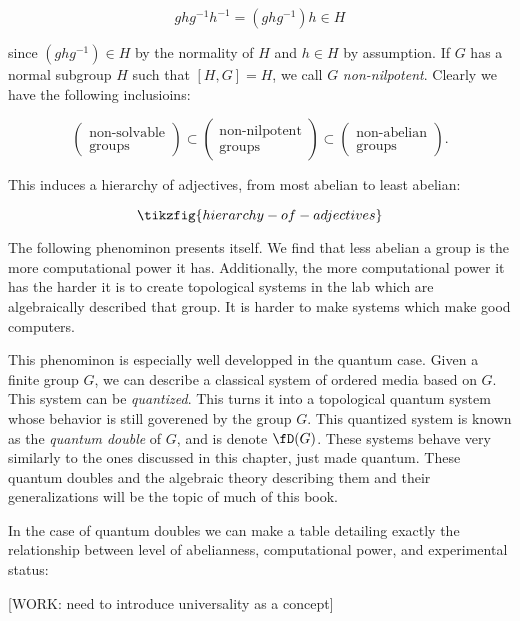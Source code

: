 $$g h g^{-1} h^{-1}= (g h g^{-1}) h \in H$$

since $(g h g^{-1}) \in H$ by the normality of $H$ and $h\in H$ by assumption. If $G$ has a normal subgroup $H$ such that $[H,G]=H$, we call $G$ \textit{non-nilpotent}. Clearly we have the following inclusioins:

$$
\left(\substack{\text{non-solvable} \\ \text{groups}}\right)\subset
\left(\substack{\text{non-nilpotent} \\ \text{groups}}\right)\subset
\left(\substack{\text{non-abelian} \\ \text{groups}}\right).
$$

This induces a hierarchy of adjectives, from most abelian to least abelian:

\begin{equation*}
\tikzfig{hierarchy-of-adjectives}
\end{equation*}


The following phenominon presents itself. We find that less abelian a group is the more computational power it has. Additionally, the more computational power it has the harder it is to create topological systems in the lab which are algebraically described that group. It is harder to make systems which make good computers.

This phenominon is especially well developped in the quantum case. Given a finite group $G$, we can describe a classical system of ordered media based on $G$. This system can be \textit{quantized}. This turns it into a topological quantum system whose behavior is still goverened by the group $G$. This quantized system is known as the \textit{quantum double} of $G$, and is denote $\fD(G)$. These systems behave very similarly to the ones discussed in this chapter, just made quantum. These quantum doubles and the algebraic theory describing them and their generalizations will be the topic of much of this book.

In the case of quantum doubles we can make a table detailing exactly the relationship between level of abelianness, computational power, and experimental status:

[WORK: need to introduce universality as a concept]

